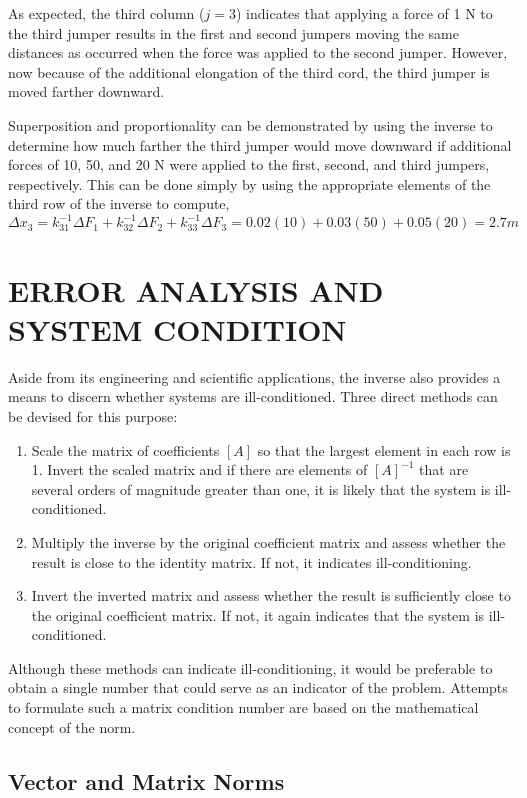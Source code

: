 \documentclass[../main.tex]{subfiles}
\begin{document}
As expected, the third column ($j = 3$) indicates that applying a force of 1 N to the
third jumper results in the first and second jumpers moving the same distances as occurred when the force was applied to the second jumper. However, now because of the additional elongation of the third cord, the third jumper is moved farther downward.

Superposition and proportionality can be demonstrated by using the inverse to determine how much farther the third jumper would move downward if additional forces of 10,
50, and 20 N were applied to the first, second, and third jumpers, respectively. This can be done simply by using the appropriate elements of the third row of the inverse to compute,
\begin{equation}
\Delta x_{3} = k_{31}^{-1} \Delta F_{1} +k_{32}^{-1} \Delta F_{2} +k_{33}^{-1} \Delta F_{3} = 0.02(10) + 0.03(50) + 0.05(20) = 2.7 m
\end{equation}

\section{ERROR ANALYSIS AND SYSTEM CONDITION}
Aside from its engineering and scientific applications, the inverse also provides a means to
discern whether systems are ill-conditioned. Three direct methods can be devised for this purpose:
\begin{enumerate}
\item Scale the matrix of coefficients $[A]$ so that the largest element in each row is 1. Invert the scaled matrix and if there are elements of $[A]^{-1}$ that are several orders of magnitude greater than one, it is likely that the system is ill-conditioned.
\item Multiply the inverse by the original coefficient matrix and assess whether the result is close to the identity matrix. If not, it indicates ill-conditioning.
\item Invert the inverted matrix and assess whether the result is sufficiently close to the original coefficient matrix. If not, it again indicates that the system is ill-conditioned.
\end{enumerate}
Although these methods can indicate ill-conditioning, it would be preferable to obtain
a single number that could serve as an indicator of the problem. Attempts to formulate such
a matrix condition number are based on the mathematical concept of the norm.

\subsection{Vector and Matrix Norms}
\end{document}
